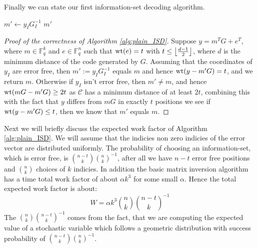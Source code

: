 Finally we can state our first information-set decoding algorithm.
\begin{algorithm}[H]
\caption{Plain information-set decoding}\label{alg:plain_ISD}
\begin{algorithmic}
  \State $m' \gets y_IG_I^{-1}$
  \State \Return $m'$
  \EndIf
  \EndFor
  \EndProcedure
\end{algorithmic}
\end{algorithm}

\begin{proof}[Proof of the correctness of Algorithm \ref{alg:plain_ISD}]
  Suppose $y = m^TG + e^T$, where $m \in \mathbb{F}_q^{k}$ and $e \in \mathbb{F}_q^n$ such that $\mathrm{wt}(e) = t$ with  $t \leq \left\lfloor\frac{d - 1}{2}\right\rfloor$, where $d$ is the minimum distance of the code generated by $G$. Assuming that the coordinates of $y_I$ are error free, then $m' := y_IG_I^{-1}$ equals $m$ and hence $\mathrm{wt}(y - m'G) = t$, and we return $m$. Otherwise if $y_I$ isn't error free, then $m' \neq m$, and hence $\mathrm{wt}(mG - m'G) \geq 2t$ as $\mathcal{C}$ has a minimum distance of at least $2t$, combining this with the fact that $y$ differs from $mG$ in exactly $t$ positions we see if $\mathrm{wt}(y - m'G) \leq t$, then we know that $m'$ equals $m$.
\end{proof}
Next we will briefly discuss the expected work factor of Algorithm \ref{alg:plain_ISD}. We will assume that the indicies non zero indicies of the error vector are distributed uniformly. The probability of choosing an information-set, which is error free, is $\binom{n - t}{k} \binom{n}{k}^{-1}$, after all we have $n - t$ error free positions and $\binom{n}{k}$ choices of $k$ indicies. In addition the basic matrix inversion algorithm has a time total work factor of about $\alpha k^3$ for some small $\alpha$. Hence the total expected work factor is about:
\begin{equation*}
  W = \alpha k^3 \binom{n}{k} \binom{n - t}{k}^{-1}
\end{equation*}
The $\binom{n}{k} \binom{n - t}{k}^{-1}$ comes from the fact, that we are computing the expected value of a stochastic variable which follows a geometric distribution with success probability of $\binom{n - t}{k} \binom{n}{k}^{-1}$.
